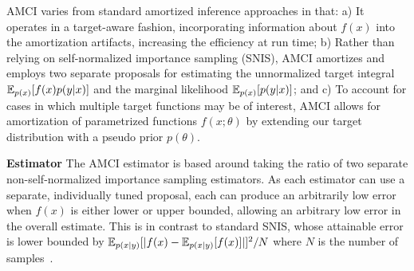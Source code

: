 \documentclass[12pt]{article}
\begin{document}



AMCI varies from standard amortized inference approaches in that: 
a) It operates in a target-aware fashion, incorporating
information about $f(x)$ into the amortization artifacts, increasing the efficiency 
at run time; b) Rather than
relying on self-normalized importance sampling (SNIS), AMCI amortizes and employs two separate proposals for estimating
the unnormalized target integral $\mathbb{E}_{p(x)}\!\left[f(x)p(y|x)\right]$ and the marginal
likelihood $\mathbb{E}_{p(x)}\!\left[p(y|x)\right]$; and c)
To account for cases in which multiple target functions may be
of interest, AMCI allows for amortization of parametrized functions $f(x ; \theta)$
by extending our target distribution
with a pseudo prior $p(\theta)$.  


\textbf{Estimator} \quad The AMCI estimator is based around
taking the ratio of two 
separate non-self-normalized importance sampling estimators.
As each estimator can use a separate, individually tuned proposal, 
each can produce an arbitrarily low error when
$f(x)$ is either lower or upper bounded, allowing an arbitrary low
error in the overall estimate.
This is in contrast to standard SNIS, whose attainable 
error is lower bounded 
by $\mathbb{E}_{p(x|y)} [|f(x) - \mathbb{E}_{p(x|y)}[f(x)]|] ^2/N$
where $N$ is the number of samples~\citep{mcbook}.
\end{document}
